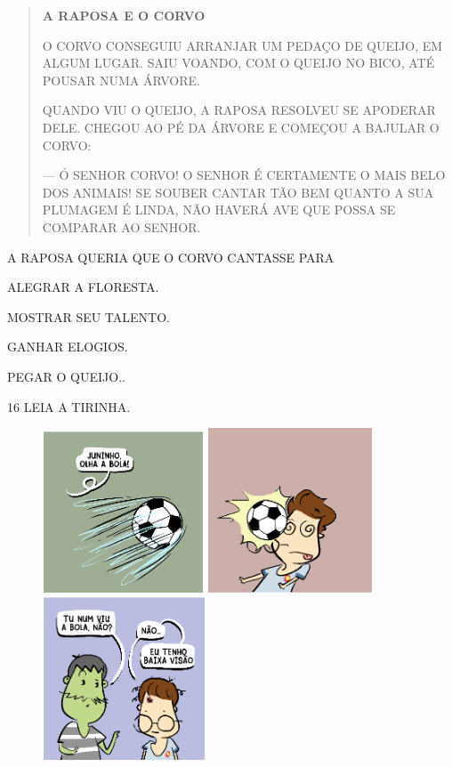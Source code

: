 \begin{quote}
\textbf{A RAPOSA E O CORVO}

O CORVO CONSEGUIU ARRANJAR UM PEDAÇO DE QUEIJO, EM ALGUM
LUGAR. SAIU VOANDO, COM O QUEIJO NO BICO, ATÉ POUSAR NUMA
ÁRVORE.

QUANDO VIU O QUEIJO, A RAPOSA RESOLVEU SE APODERAR
DELE. CHEGOU AO PÉ DA ÁRVORE E COMEÇOU A BAJULAR O CORVO:

--- Ó SENHOR CORVO! O SENHOR É CERTAMENTE O MAIS BELO
DOS ANIMAIS! SE SOUBER CANTAR TÃO BEM QUANTO A SUA PLUMAGEM
É LINDA, NÃO HAVERÁ AVE QUE POSSA SE COMPARAR AO SENHOR.

\end{quote}

A RAPOSA QUERIA QUE O CORVO CANTASSE PARA

\begin{escolha}
\item ALEGRAR A FLORESTA.

\item MOSTRAR SEU TALENTO.

\item GANHAR ELOGIOS.

\item PEGAR O QUEIJO..
\end{escolha}

\num{16} LEIA A TIRINHA.

\begin{figure}[htpb]
\includegraphics[width=1.88542in,height=1.88542in]{media/image236.png}
\includegraphics[width=1.92708in,height=1.92708in]{media/image237.png}
\includegraphics[width=1.90625in,height=1.90625in]{media/image238.png}
\end{figure}

